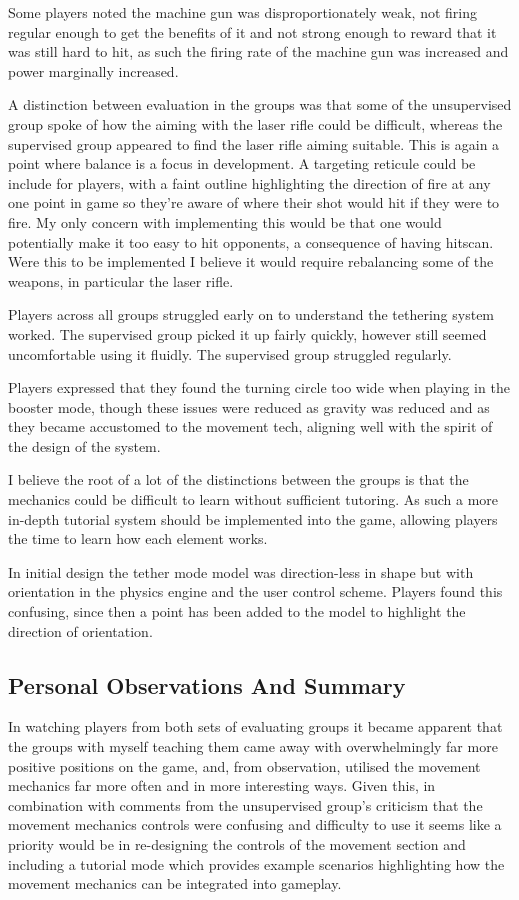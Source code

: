 \documentclass[10pt,a4paper]{article}
\begin{document}
Some players noted the machine gun was disproportionately weak, not firing regular enough to get the benefits of it and not strong enough to reward that it was still hard to hit, as such the firing rate of the machine gun was increased and power marginally increased.

A distinction between evaluation in the groups was that some of the unsupervised group spoke of how the aiming with the laser rifle could be difficult, whereas the supervised group appeared to find the laser rifle aiming suitable. This is again a point where balance is a focus in development. A targeting reticule could be include for players, with a faint outline highlighting the direction of fire at any one point in game so they're aware of where their shot would hit if they were to fire. My only concern with implementing this would be that one would potentially make it too easy to hit opponents, a consequence of having hitscan. Were this to be implemented I believe it would require rebalancing some of the weapons, in particular the laser rifle. 

Players across all groups struggled early on to understand the tethering system worked. The supervised group picked it up fairly quickly, however still seemed uncomfortable using it fluidly. The supervised group struggled regularly.

Players expressed that they found the turning circle too wide when playing in the booster mode, though these issues were reduced as gravity was reduced and as they became accustomed to the movement tech, aligning well with the spirit of the design of the system.

I believe the root of a lot of the distinctions between the groups is that the mechanics could be difficult to learn without sufficient tutoring. As such a more in-depth tutorial system should be implemented into the game, allowing players the time to learn how each element works.

In initial design the tether mode model was direction-less in shape but with orientation in the physics engine and the user control scheme. Players found this confusing, since then a point has been added to the model to highlight the direction of orientation.

\subsection{Personal Observations And Summary}

In watching players from both sets of evaluating groups it became apparent that the groups with myself teaching them came away with overwhelmingly far more positive positions on the game, and, from observation, utilised the movement mechanics far more often and in more interesting ways. Given this, in combination with comments from the unsupervised group's criticism that the movement mechanics controls were confusing and difficulty to use it seems like a priority would be in re-designing the controls of the movement section and including a tutorial mode which provides example scenarios highlighting how the movement mechanics can be integrated into gameplay.
\end{document}
